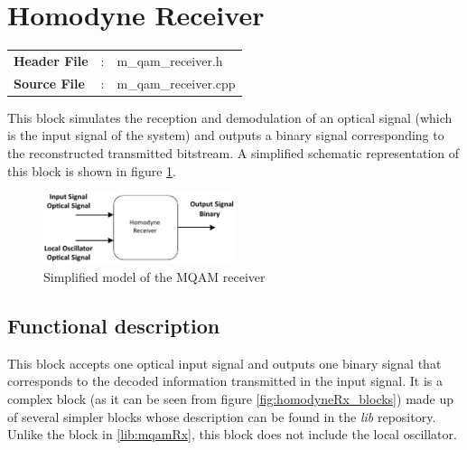 \clearpage

\section{Homodyne Receiver}\label{lib:homodyneRx}

\begin{tcolorbox}	
	\begin{tabular}{p{2.75cm} p{0.2cm} p{10.5cm}} 	
		\textbf{Header File}   &:& m\_qam\_receiver.h \\
		\textbf{Source File}   &:& m\_qam\_receiver.cpp \\
	\end{tabular}
\end{tcolorbox}

This block simulates the reception and demodulation of an optical 
signal (which is the input signal of the system) and outputs a binary signal 
corresponding to the reconstructed transmitted bitstream. 
 A simplified schematic representation of this block is shown in 
figure 
\ref{fig:homodyneRx_simple}.

\begin{figure}[h]
	\centering
	\includegraphics[width=0.5\textwidth]{../lib/homodyne_receiver_withoutLO/figures/homodyneRx_simple.pdf}
	\caption{Simplified model of the MQAM 
	receiver}\label{fig:homodyneRx_simple}
\end{figure}

\subsection*{Functional description}

This block accepts one optical input signal and outputs one binary signal that 
corresponds to the decoded information transmitted in the input signal. It is a 
complex 
block (as it can be seen from figure \ref{fig:homodyneRx_blocks}) made up of 
several simpler blocks whose description can be found in the 
\textit{lib} repository. Unlike the block in \ref{lib:mqamRx}, this block does 
not include the local oscillator.

